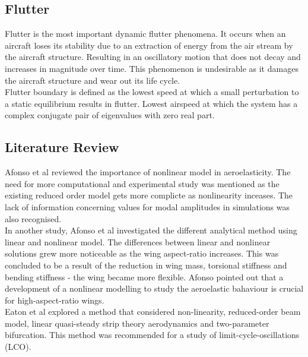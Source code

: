 \documentclass{article}
\begin{document}
\subsection{Flutter}

Flutter is the most important dynamic flutter phenomena\cite{MohammedFREEWINGS}. It occurs when an aircraft loses its stability due to an extraction of energy from the air stream by the aircraft structure. Resulting in an oscillatory motion that does not decay and increases in magnitude over time. This phenomenon is undesirable as it damages the aircraft structure and wear out its life cycle.\\

Flutter boundary is defined as  the lowest speed at which a small perturbation to a static equilibrium results in flutter. Lowest airspeed at which the system has a complex conjugate pair of eigenvalues with zero real part. 

\subsection{Literature Review}
Afonso et al\cite{Afonso2017AWings} reviewed the importance of nonlinear model in aeroelasticity. The need for more computational and experimental study was mentioned as the existing reduced order model gets more complicte as nonlinearity inceases. The lack of information concerning values for modal amplitudes in simulations was also recognised.\\

In another study, Afonso et al \cite{Afonso2015LINEARWINGS} investigated the different analytical method using linear and nonlinear model. The differences between linear and nonlinear solutions grew more noticeable as the wing aspect-ratio increases. This was concluded to be a result of the reduction in wing mass, torsional stiffness and bending stiffness - the wing became more flexible. Afonso pointed out that a development of a nonlinear modelling to study the aeroelastic bahaviour is crucial for high-aspect-ratio wings.\\

Eaton et al \cite{EatonNumericalWings} explored a method that considered non-linearity, reduced-order beam model, linear quasi-steady strip theory aerodynamics and two-parameter bifurcation. This method was recommended for a study of limit-cycle-oscillations (LCO).\\
\end{document}
